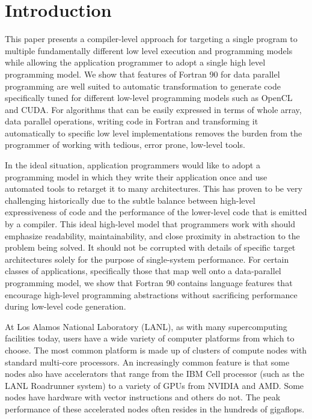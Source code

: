 \section{Introduction}
\label{sec:intro}

This paper presents a compiler-level approach for targeting a single
program to multiple fundamentally different low level execution and
programming models while allowing the application programmer to adopt
a single high level programming model.  We show that features of
Fortran 90 for data parallel programming are well suited to automatic
transformation to generate code specifically tuned for different
low-level programming models such as OpenCL and CUDA.  For algorithms
that can be easily expressed in terms of whole array, data parallel
operations, writing code in Fortran and transforming it automatically
to specific low level implementations removes the burden from the
programmer of working with tedious, error prone, low-level tools.

In the ideal situation, application programmers would like to adopt
a programming model in which they write their application once and
use automated tools to retarget it to many architectures.  This has
proven to be very challenging historically due to the subtle balance
between high-level expressiveness of code and the performance of the
lower-level code that is emitted by a compiler.  This ideal high-level
model that programmers work with should emphasize readability,
maintainability, and close proximity in abstraction to the problem being
solved.  It should not be corrupted with details of specific target
architectures solely for the purpose of single-system performance.
For certain classes of applications, specifically those that map well
onto a data-parallel programming model, we show that Fortran 90 contains
language features that encourage high-level programming abstractions
without sacrificing performance during low-level code generation.


At Los Alamos National Laboratory (LANL), as with many supercomputing
facilities today, users have a wide variety of computer platforms from
which to choose.  The most common platform is made up of clusters of
compute nodes with standard multi-core processors.  An increasingly
common feature is that some nodes also have accelerators that range
from the IBM Cell processor (such as the LANL Roadrunner system) to a
variety of GPUs from NVIDIA and AMD.  Some nodes have hardware with
vector instructions and others do not.  The peak performance of these
accelerated nodes often resides in the hundreds of gigaflops.

